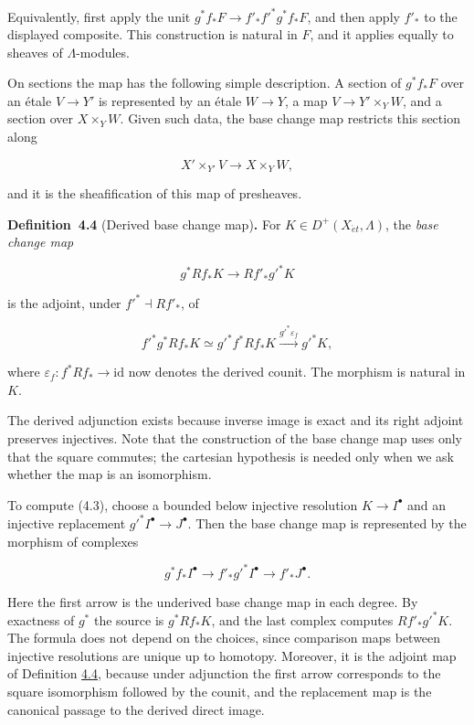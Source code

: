 \documentclass[11pt]{article}
\newenvironment{bpstatement}[2]{\par\addvspace{0.6\baselineskip}\noindent\textbf{#1}#2\textbf{.}\enspace\ignorespaces}
  {\par\addvspace{0.4\baselineskip}}
\begin{document}
\label{bp12}%
Equivalently, first apply the unit \(g^*f_*F\to f'_*f'^*g^*f_*F\), and then apply \(f'_*\) to the displayed composite. This construction is natural in \(F\), and it applies equally to sheaves of \(\Lambda\)-modules.

On sections the map has the following simple description. A section of \(g^*f_*F\) over an étale \(V\to Y'\) is represented by an étale \(W\to Y\), a map \(V\to
Y'\times_YW\), and a section over \(X\times_YW\). Given such data, the base change map restricts this section along

\[
X'\times_{Y'}V\longrightarrow X\times_YW,
\]

and it is the sheafification of this map of presheaves.

\label{bp13}%
\begin{bpstatement}{Definition~4.4}{ (Derived base change map)}
For \(K\in D^+(X_{\acute{e}t},\Lambda)\), the \emph{base change map}

\[
g^*Rf_*K\longrightarrow Rf'_*g'^*K
\tag{4.3}
\]

is the adjoint, under \(f'^*\dashv Rf'_*\), of

\[
f'^*g^*Rf_*K
\simeq g'^*f^*Rf_*K
\xrightarrow{g'^*\varepsilon_f}g'^*K,
\]

where \(\varepsilon_f:f^*Rf_*\to\mathrm{id}\) now denotes the derived counit. The morphism is natural in \(K\).
\end{bpstatement}

\label{bp14}%
The derived adjunction exists because inverse image is exact and its right adjoint preserves injectives. Note that the construction of the base change map uses only that the square commutes; the cartesian hypothesis is needed only when we ask whether the map is an isomorphism.

To compute (4.3), choose a bounded below injective resolution \(K\to I^\bullet\) and an injective replacement \(g'^*I^\bullet\to J^\bullet\). Then the base change map is represented by the morphism of complexes

\[
g^*f_*I^\bullet
\longrightarrow
f'_*g'^*I^\bullet\longrightarrow f'_*J^\bullet.
\tag{4.4}
\]

Here the first arrow is the underived base change map in each degree. By exactness of \(g^*\) the source is \(g^*Rf_*K\), and the last complex computes \(Rf'_*g'^*K\). The formula does not depend on the choices, since comparison maps between injective resolutions are unique up to homotopy. Moreover, it is the adjoint map of Definition \hyperref[bp13]{4.4}, because under adjunction the first arrow corresponds to the square isomorphism followed by the counit, and the replacement map is the canonical passage to the derived direct image.
\end{document}

